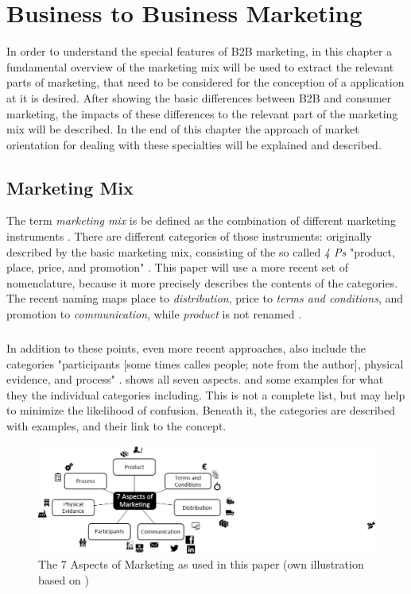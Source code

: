 \chapter{Business to Business Marketing}
In order to understand the special features of B2B marketing, in this chapter a fundamental overview of the marketing mix will be used to extract the relevant parts of marketing, that need to be considered for the conception of a application at it is desired. After showing the basic differences between B2B and consumer marketing, the impacts of these differences to the relevant part of the marketing mix will be described. In the end of this chapter the approach of market orientation for dealing with these specialties will be explained and described.
\section{Marketing Mix}
The term \textit{marketing mix} is be defined as the combination of different marketing instruments \parencite[cf.][285]{Thommen.2012}. There are  different categories of those instruments: originally described by \textcite[cf.][]{McCarthy.1993} the basic marketing mix, consisting of the so called \textit{4 Ps} "product, place, price, and promotion" . This paper will use a more recent set of nomenclature, because it more precisely describes the contents of the categories. The recent naming maps place to \textit{distribution}, price to \textit{terms and conditions}, and promotion to \textit{communication}, while \textit{product} is not renamed \parencites[285]{Thommen.2012}[cf.][397-720]{Meffert.2015}. 
\paragraph*{} In addition to these points, even more recent approaches, also include the categories "participants [some times calles people; note from the author], physical evidence, and process" \parencite{Rafiq.1995}.  shows all seven aspects.  and some examples for what they the individual categories including. This is not a complete list, but may help to minimize the likelihood of confusion. Beneath it, the categories are described with examples, and their link to the concept.

\begin{figure}[H]
	\includegraphics[width=\textwidth]{img/7p.png}
	\caption[7 Aspects of Marketing]{The 7 Aspects of Marketing as used in this paper (own illustration based on \protect\cites[285]{Thommen.-2012}[397-720]{Meffert.2015}{Hoepner2015})}
	\label{fig:aspects}
\end{figure}

